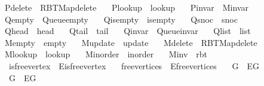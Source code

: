 \begin{isabellebody}
\ \ P{\isacharunderscore}{\kern0pt}delete\ {\isacharequal}{\kern0pt}\ RBT{\isacharunderscore}{\kern0pt}Map{\isachardot}{\kern0pt}delete\ \isanewline
\ \ P{\isacharunderscore}{\kern0pt}lookup\ {\isacharequal}{\kern0pt}\ lookup\ \isanewline
\ \ P{\isacharunderscore}{\kern0pt}invar\ {\isacharequal}{\kern0pt}\ M{\isachardot}{\kern0pt}invar\ \isanewline
\ \ Q{\isacharunderscore}{\kern0pt}empty\ {\isacharequal}{\kern0pt}\ Queue{\isachardot}{\kern0pt}empty\ \isanewline
\ \ Q{\isacharunderscore}{\kern0pt}is{\isacharunderscore}{\kern0pt}empty\ {\isacharequal}{\kern0pt}\ is{\isacharunderscore}{\kern0pt}empty\ \isanewline
\ \ Q{\isacharunderscore}{\kern0pt}snoc\ {\isacharequal}{\kern0pt}\ snoc\ \isanewline
\ \ Q{\isacharunderscore}{\kern0pt}head\ {\isacharequal}{\kern0pt}\ head\ \isanewline
\ \ Q{\isacharunderscore}{\kern0pt}tail\ {\isacharequal}{\kern0pt}\ tail\ \isanewline
\ \ Q{\isacharunderscore}{\kern0pt}invar\ {\isacharequal}{\kern0pt}\ Queue{\isachardot}{\kern0pt}invar\ \isanewline
\ \ Q{\isacharunderscore}{\kern0pt}list\ {\isacharequal}{\kern0pt}\ list\ \isanewline
\ \ M{\isacharunderscore}{\kern0pt}empty\ {\isacharequal}{\kern0pt}\ empty\ \isanewline
\ \ M{\isacharunderscore}{\kern0pt}update\ {\isacharequal}{\kern0pt}\ update\ \isanewline
\ \ M{\isacharunderscore}{\kern0pt}delete\ {\isacharequal}{\kern0pt}\ RBT{\isacharunderscore}{\kern0pt}Map{\isachardot}{\kern0pt}delete\ \isanewline
\ \ M{\isacharunderscore}{\kern0pt}lookup\ {\isacharequal}{\kern0pt}\ lookup\ \isanewline
\ \ M{\isacharunderscore}{\kern0pt}inorder\ {\isacharequal}{\kern0pt}\ inorder\ \isanewline
\ \ M{\isacharunderscore}{\kern0pt}inv\ {\isacharequal}{\kern0pt}\ rbt\isanewline
\ \ \ is{\isacharunderscore}{\kern0pt}free{\isacharunderscore}{\kern0pt}vertex\ {\isacharequal}{\kern0pt}\ E{\isachardot}{\kern0pt}is{\isacharunderscore}{\kern0pt}free{\isacharunderscore}{\kern0pt}vertex\isanewline
\ \ \ free{\isacharunderscore}{\kern0pt}vertices\ {\isacharequal}{\kern0pt}\ E{\isachardot}{\kern0pt}free{\isacharunderscore}{\kern0pt}vertices\isanewline
\ \ \ G{}{\isacharunderscore}{\kern0pt}{}\ {\isacharequal}{\kern0pt}\ E{\isachardot}{\kern0pt}G{}{\isacharunderscore}{\kern0pt}{}\isanewline
\ \ \ G{}{\isacharunderscore}{\kern0pt}{}\ {\isacharequal}{\kern0pt}\ E{\isachardot}{\kern0pt}G{}{\isacharunderscore}{\kern0pt}{}\isanewline

\end{isabellebody}
